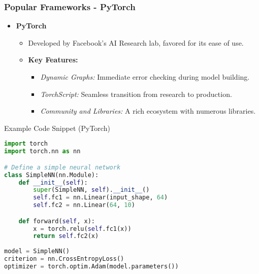 \documentclass[aspectratio=169]{beamer}
\begin{document}
\begin{frame}
    \frametitle{Popular Frameworks - PyTorch}
    \begin{itemize}
        \item \textbf{PyTorch}
        \begin{itemize}
            \item Developed by Facebook's AI Research lab, favored for its ease of use.
            \item \textbf{Key Features:}
            \begin{itemize}
                \item \textit{Dynamic Graphs:} Immediate error checking during model building.
                \item \textit{TorchScript:} Seamless transition from research to production.
                \item \textit{Community and Libraries:} A rich ecosystem with numerous libraries.
            \end{itemize}
        \end{itemize}
    \end{itemize}
    
    \begin{block}{Example Code Snippet (PyTorch)}
    \begin{lstlisting}[language=Python]
import torch
import torch.nn as nn

# Define a simple neural network
class SimpleNN(nn.Module):
    def __init__(self):
        super(SimpleNN, self).__init__()
        self.fc1 = nn.Linear(input_shape, 64)
        self.fc2 = nn.Linear(64, 10)

    def forward(self, x):
        x = torch.relu(self.fc1(x))
        return self.fc2(x)
    
model = SimpleNN()
criterion = nn.CrossEntropyLoss()
optimizer = torch.optim.Adam(model.parameters())
    \end{lstlisting}
    \end{block}
\end{frame}
\end{document}
